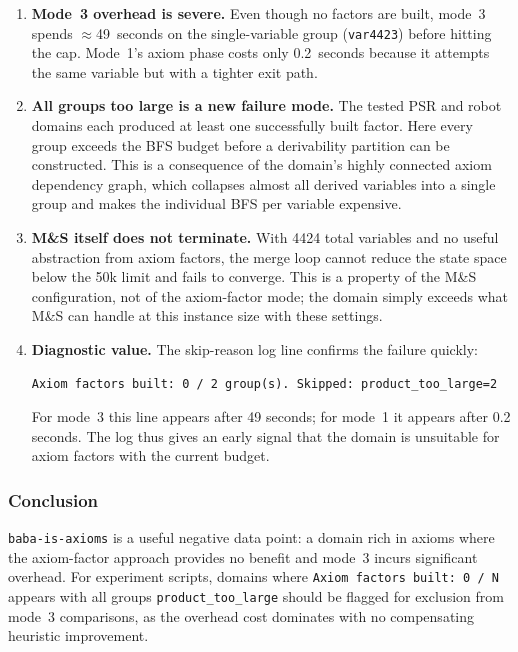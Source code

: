 \documentclass[11pt,a4paper]{article}
\begin{document}
\begin{enumerate}
  \item \textbf{Mode~3 overhead is severe.}  Even though no factors are
        built, mode~3 spends $\approx$49~seconds on the single-variable group
        (\texttt{var4423}) before hitting the cap.  Mode~1's axiom phase costs
        only 0.2~seconds because it attempts the same variable but with a
        tighter exit path.

  \item \textbf{All groups too large is a new failure mode.}  The tested PSR
        and robot domains each produced at least one successfully built factor.
        Here every group exceeds the BFS budget before a derivability partition
        can be constructed.  This is a consequence of the domain's highly
        connected axiom dependency graph, which collapses almost all derived
        variables into a single group and makes the individual BFS per variable
        expensive.

  \item \textbf{M\&S itself does not terminate.}  With 4424 total variables
        and no useful abstraction from axiom factors, the merge loop cannot
        reduce the state space below the 50k limit and fails to converge.
        This is a property of the M\&S configuration, not of the axiom-factor
        mode; the domain simply exceeds what M\&S can handle at this instance
        size with these settings.

  \item \textbf{Diagnostic value.}  The skip-reason log line confirms the
        failure quickly:
\begin{verbatim}
Axiom factors built: 0 / 2 group(s). Skipped: product_too_large=2
\end{verbatim}
        For mode~3 this line appears after 49 seconds; for mode~1 it appears
        after 0.2 seconds.  The log thus gives an early signal that the domain
        is unsuitable for axiom factors with the current budget.
\end{enumerate}

\subsubsection*{Conclusion}

\texttt{baba-is-axioms} is a useful negative data point: a domain rich in
axioms where the axiom-factor approach provides no benefit and mode~3 incurs
significant overhead.  For experiment scripts, domains where
\texttt{Axiom factors built: 0 / N} appears with all groups
\texttt{product\_too\_large} should be flagged for exclusion from mode~3
comparisons, as the overhead cost dominates with no compensating heuristic
improvement.
\end{document}
